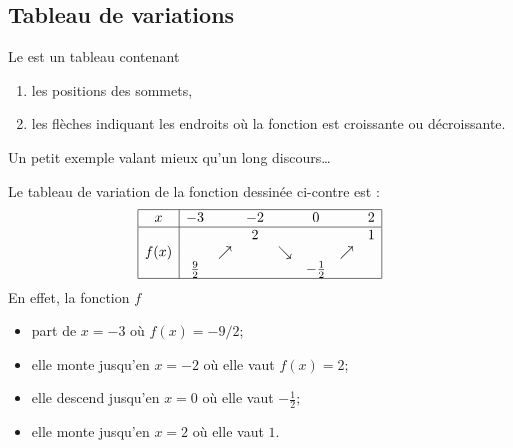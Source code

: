 \subsection{Tableau de variations}

Le  est un tableau contenant
\begin{enumerate}
    \item
        les positions des sommets,
    \item
        les flèches indiquant les endroits où la fonction est croissante ou décroissante.
\end{enumerate}
Un petit exemple valant mieux qu'un long discours\ldots

\begin{multicols}{2}

    Le tableau de variation de la fonction dessinée ci-contre est :
    \begin{equation}
    \begin{array}[h]{|c|ccccccc|}
        \hline
        x&-3&&-2&&0&&2\\
        \hline
        &&&2&&&&1\\
        f(x)&&\nearrow&&\searrow&&\nearrow&\\
        &\frac{ 9 }{2}&&&&-\frac{ 1 }{2}&&\\
        \hline
    \end{array}
    \end{equation}
    En effet, la fonction \( f\)
    \begin{itemize}
        \item 
            part de \( x=-3\) où \( f(x)=-9/2\);
        \item
            elle monte jusqu'en \( x=-2\) où elle vaut \( f(x)=2\);
        \item
            elle descend jusqu'en \( x=0\) où elle vaut \( -\frac{ 1 }{2}\);
        \item
            elle monte jusqu'en \( x=2\) où elle vaut \( 1\).
    \end{itemize}

\columnbreak




\end{multicols}

